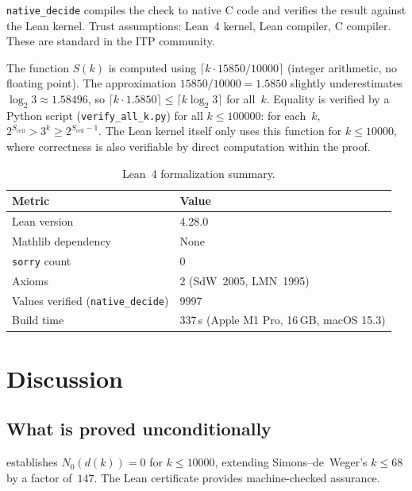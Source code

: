 \documentclass[11pt, a4paper]{amsart}
\theoremstyle{plain}
\theoremstyle{definition}
\theoremstyle{remark}
\begin{document}
\texttt{native\_decide} compiles the check to native C code
and verifies the result against the Lean kernel.
Trust assumptions: Lean~4 kernel, Lean compiler, C compiler.
These are standard in the ITP community.

The function $S(k)$ is computed using
$\lceil k \cdot 15850 / 10000 \rceil$ (integer arithmetic,
no floating point).  The approximation
$15850/10000 = 1.5850$ slightly underestimates
$\log_2 3 \approx 1.58496$, so
$\lceil k \cdot 1.5850 \rceil \leq \lceil k \log_2 3 \rceil$
for all~$k$.  Equality is verified by a Python script
(\texttt{verify\_all\_k.py})
for all $k \leq 100000$: for each~$k$,
$2^{S_{\text{ceil}}} > 3^k \geq 2^{S_{\text{ceil}}-1}$.
The Lean kernel itself only uses this function for
$k \leq 10000$, where correctness is also verifiable
by direct computation within the proof.

\begin{table}[ht]
\centering
\caption{Lean~4 formalization summary.}
\label{tab:lean}
\begin{tabular}{ll}
\toprule
Metric & Value \\
\midrule
Lean version & 4.28.0 \\
Mathlib dependency & None \\
\texttt{sorry} count & 0 \\
Axioms & 2 (SdW~2005, LMN~1995) \\
Values verified (\texttt{native\_decide}) & 9997 \\
Build time & 337\,s (Apple M1 Pro, 16\,GB, macOS 15.3) \\
\bottomrule
\end{tabular}
\end{table}

\section{Discussion}\label{sec:discussion}

\subsection{What is proved unconditionally}\label{ssec:unconditional}

 establishes $N_0(d(k)) = 0$ for
$k \leq 10000$, extending Simons--de~Weger's $k \leq 68$
by a factor of~$147$.  The Lean certificate provides
machine-checked assurance.
\end{document}

